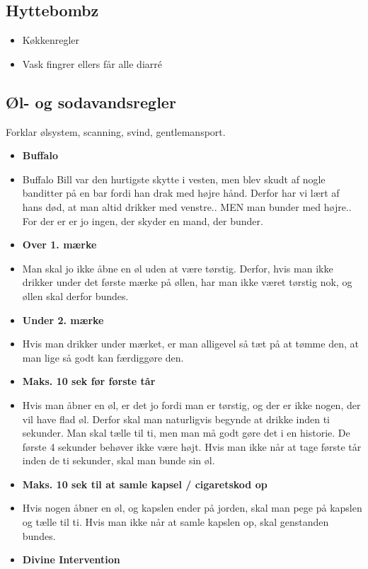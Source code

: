 \subsection{Hyttebombz}
\begin{itemize}
  \item Køkkenregler
  \item Vask fingrer ellers får alle diarré
\end{itemize}

\subsection{Øl- og sodavandsregler}
\vspace{-0.8em}
Forklar ølsystem, scanning, svind, gentlemansport.
\begin{itemize}
\item \textbf{Buffalo}
\item[] Buffalo Bill var den hurtigste skytte i vesten, men blev skudt af nogle banditter på en bar fordi han drak med højre hånd. Derfor har vi lært af hans død, at man altid drikker med venstre.. MEN man bunder med højre.. For der er er jo ingen, der skyder en mand, der bunder.
\item \textbf{ Over 1. mærke}
\item[] Man skal jo ikke åbne en øl uden at være tørstig. Derfor, hvis man ikke drikker under det første mærke på øllen, har man ikke været tørstig nok, og øllen skal derfor bundes.
\item \textbf{Under 2. mærke}
\item[] Hvis man drikker under mærket, er man alligevel så tæt på at tømme den, at man lige så godt kan færdiggøre den.
\item \textbf{Maks. 10 sek før første tår}
\item[] Hvis man åbner en øl, er det jo fordi man er tørstig, og der er ikke nogen, der vil have flad øl. Derfor skal man naturligvis begynde at drikke inden ti sekunder. Man skal tælle til ti, men man må godt gøre det i en historie. De første 4 sekunder behøver ikke være højt. Hvis man ikke når at tage første tår inden de ti sekunder, skal man bunde sin øl.
\item \textbf{Maks. 10 sek til at samle kapsel / cigaretskod op}
\item[] Hvis nogen åbner en øl, og kapslen ender på jorden, skal man pege på kapslen og tælle til ti. Hvis man ikke når at samle kapslen op, skal genstanden bundes. 
\item \textbf{Divine Intervention}

\end{itemize}
